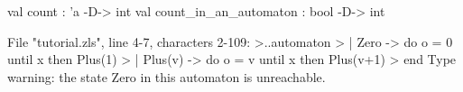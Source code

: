 \chklistingtrue
{}
\begin{ChkListingMsg}
val count : 'a -D-> int
val count_in_an_automaton : bool -D-> int
\end{ChkListingMsg}
\begin{ChkListingErr}
File "tutorial.zls", line 4-7, characters 2-109:
>..automaton
>  | Zero    -> do o = 0 until x then Plus(1)
>  | Plus(v) -> do o = v until x then Plus(v+1)
>  end
Type warning: the state Zero in this automaton is unreachable.
\end{ChkListingErr}
